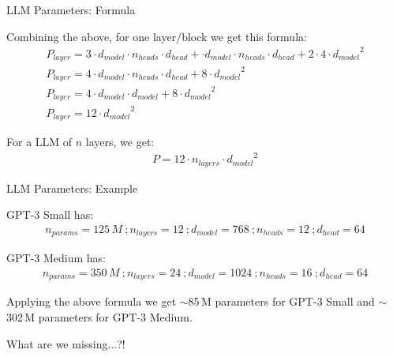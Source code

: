 
\begin{vbframe}{LLM Parameters: Formula}

\vfill

Combining the above, for one layer/block we get this formula:
\begin{equation*}
\begin{array}{c}
P_{layer} = 3 \cdot d_{model} \cdot n_{heads} \cdot d_{head} + \cdot d_{model} \cdot n_{heads} \cdot d_{head} + 2 \cdot 4 \cdot {d_{model}}^2 \\ [8pt]
P_{layer} = 4 \cdot d_{model} \cdot n_{heads} \cdot d_{head} + 8 \cdot {d_{model}}^2 \\ [8pt]
P_{layer} = 4 \cdot d_{model} \cdot d_{model} + 8 \cdot {d_{model}}^2 \\ [8pt]
P_{layer} = 12 \cdot {d_{model}}^2
\end{array}
\end{equation*}

\vskip5mm

For a LLM of $n$ layers, we get:
\begin{equation*}
\begin{array}{c}
P = 12 \cdot n_{layers} \cdot {d_{model}}^2
\end{array}
\end{equation*}

\vfill

\end{vbframe}


\begin{vbframe}{LLM Parameters: Example}

\vfill

GPT-3 Small has:
\begin{equation*}
\begin{array}{l}
n_{params} = 125\,M ~; n_{layers} = 12 ~; d_{model} = 768 ~; n_{heads} = 12 ~; d_{head} = 64 
\end{array}
\end{equation*}

\vskip2mm

GPT-3 Medium has:
\begin{equation*}
\begin{array}{l}
n_{params} = 350\,M ~; n_{layers} = 24 ~; d_{model} = 1024 ~; n_{heads} = 16 ~; d_{head} = 64 
\end{array}
\end{equation*}

\vskip2mm

Applying the above formula we get $\sim$85\,M parameters for GPT-3 Small and $\sim$302\,M parameters for GPT-3 Medium. 

\vskip2mm

What are we missing...?!

\vfill

\end{vbframe}

